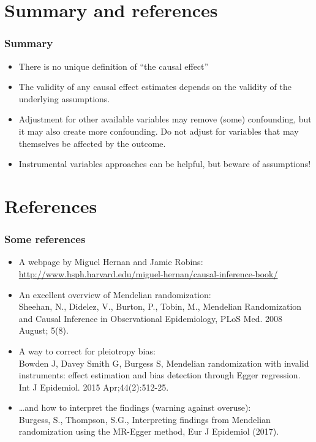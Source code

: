 \documentclass[xcolor=svgnames,handout]{beamer}
\begin{document}
\section{Summary and references}
\begin{frame}
\frametitle{Summary}
\begin{itemize}
\item There is no unique definition of ``the causal effect'' 
\item The validity of any causal effect estimates depends on the validity of the underlying assumptions.
\item Adjustment for other available variables may remove (some) confounding, but it may also create more confounding. \alert{Do not adjust for variables that may themselves be affected by the outcome.}   
\item Instrumental variables approaches can be helpful, but beware of assumptions! 
\end{itemize}
\end{frame}



\section{References}
\begin{frame}
\frametitle{Some references}
{\small
\begin{itemize}
\item A webpage by Miguel Hernan and Jamie Robins: 
\href{http://www.hsph.harvard.edu/miguel-hernan/causal-inference-book/}{http://www.hsph.harvard.edu/miguel-hernan/causal-inference-book/}
\item An excellent overview of Mendelian randomization: \\
Sheehan, N., Didelez, V., Burton, P., Tobin, M., Mendelian Randomization and Causal Inference in Observational Epidemiology, PLoS Med. 2008 August; 5(8). 
\item A way to correct for pleiotropy bias: \\
Bowden J, Davey Smith G, Burgess S, Mendelian randomization with invalid instruments: effect estimation and bias detection through Egger regression. Int J Epidemiol. 2015 Apr;44(2):512-25.
\item \ldots and how to interpret the findings (warning against overuse): \\ Burgess, S., Thompson, S.G., Interpreting findings from Mendelian randomization using the MR-Egger method, Eur J Epidemiol (2017). 
\end{itemize}}
\end{frame}
\end{document}
